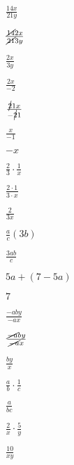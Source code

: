 \documentclass{article}
\begin{document}
\begin{enumerate}[start=28]
    \item $\frac{14x}{21y}$
    \begin{center}
        \item $\frac{\cancel{14}2x}{\cancel{21}3y}$
        \item $\frac{2x}{3y}$
    \end{center}

    \item $\frac{2x}{-2}$
    \begin{center}
        \item $\frac{\cancel{2}1x}{-\cancel{2}1}$
        \item $\frac{x}{-1}$
        \item $-x$
    \end{center}

    \item $\frac{2}{3} \cdot \frac{1}{x}$
    \begin{center}
        \item $\frac{2 \cdot 1}{3 \cdot x}$
        \item $\frac{2}{3x}$
    \end{center}

    \item $\frac{a}{c}(3b)$
    \begin{center}
        \item $\frac{3ab}{c}$
    \end{center}

    \item $5a + (7 - 5a)$
    \begin{center}
        \item $7$
    \end{center}

    \item $\frac{-aby}{-ax}$
    \begin{center}
        \item $\frac{\cancel{-a}by}{\cancel{-a}x}$
        \item $\frac{by}{x}$
    \end{center}

    \item $\frac{a}{b} \cdot \frac{1}{c}$
    \begin{center}
        \item $\frac{a}{bc}$
    \end{center}

    \item $\frac{2}{x} \cdot \frac{5}{y}$
    \begin{center}
        \item $\frac{10}{xy}$
    \end{center}


\end{enumerate}
\end{document}
